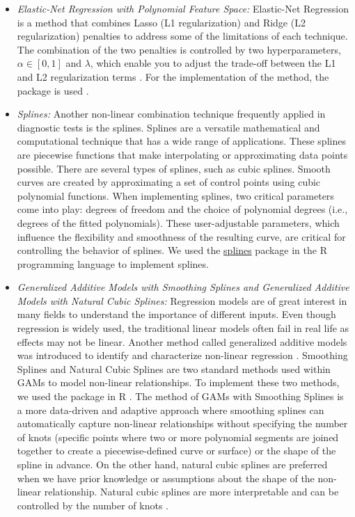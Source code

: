 \begin{itemize}
  To implement the Lasso regression in combining the diagnostic tests, we used the  package \citep{friedman2010regularization}.
\item
  \emph{Elastic-Net Regression with Polynomial Feature Space:}
  Elastic-Net Regression is a method that combines Lasso (L1 regularization) and Ridge (L2 regularization) penalties to address some of the limitations of each technique. The combination of the two penalties is controlled by two hyperparameters, \(\alpha \in [0,1]\) and \(\lambda\), which enable you to adjust the trade-off between the L1 and L2 regularization terms \citep{james2013introduction}. For the implementation of the method, the  package is used \citep{friedman2010regularization}.
\item
  \emph{Splines:}
  Another non-linear combination technique frequently applied in diagnostic tests is the splines. Splines are a versatile mathematical and computational technique that has a wide range of applications. These splines are piecewise functions that make interpolating or approximating data points possible. There are several types of splines, such as cubic splines. Smooth curves are created by approximating a set of control points using cubic polynomial functions. When implementing splines, two critical parameters come into play: degrees of freedom and the choice of polynomial degrees (i.e., degrees of the fitted polynomials). These user-adjustable parameters, which influence the flexibility and smoothness of the resulting curve, are critical for controlling the behavior of splines. We used the \href{https://www.rdocumentation.org/packages/splines/versions/3.6.2}{splines} package in the R programming language to implement splines.
\item
  \emph{Generalized Additive Models with Smoothing Splines and Generalized Additive Models with Natural Cubic Splines:}
  Regression models are of great interest in many fields to understand the importance of different inputs. Even though regression is widely used, the traditional linear models often fail in real life as effects may not be linear. Another method called generalized additive models was introduced to identify and characterize non-linear regression \citep{james2013introduction}. Smoothing Splines and Natural Cubic Splines are two standard methods used within GAMs to model non-linear relationships. To implement these two methods, we used the  package in R \citep{Trevor2015gam}. The method of GAMs with Smoothing Splines is a more data-driven and adaptive approach where smoothing splines can automatically capture non-linear relationships without specifying the number of knots (specific points where two or more polynomial segments are joined together to create a piecewise-defined curve or surface) or the shape of the spline in advance. On the other hand, natural cubic splines are preferred when we have prior knowledge or assumptions about the shape of the non-linear relationship. Natural cubic splines are more interpretable and can be controlled by the number of knots \citep{elhakeem2022using}.
\end{itemize}

